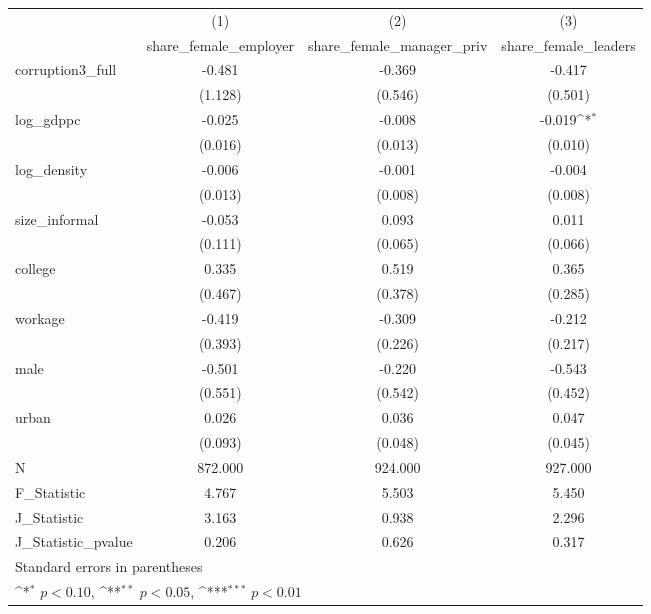 {
\def\sym#1{\ifmmode^{#1}\else\(^{#1}\)\fi}
\begin{tabular}{l*{3}{c}}
\hline\hline
            &\multicolumn{1}{c}{(1)}&\multicolumn{1}{c}{(2)}&\multicolumn{1}{c}{(3)}\\
            &\multicolumn{1}{c}{share\_female\_employer}&\multicolumn{1}{c}{share\_female\_manager\_priv}&\multicolumn{1}{c}{share\_female\_leaders}\\
\hline
corruption3\_full&      -0.481         &      -0.369         &      -0.417         \\
            &     (1.128)         &     (0.546)         &     (0.501)         \\
[1em]
log\_gdppc   &      -0.025         &      -0.008         &      -0.019\sym{*}  \\
            &     (0.016)         &     (0.013)         &     (0.010)         \\
[1em]
log\_density &      -0.006         &      -0.001         &      -0.004         \\
            &     (0.013)         &     (0.008)         &     (0.008)         \\
[1em]
size\_informal&      -0.053         &       0.093         &       0.011         \\
            &     (0.111)         &     (0.065)         &     (0.066)         \\
[1em]
college     &       0.335         &       0.519         &       0.365         \\
            &     (0.467)         &     (0.378)         &     (0.285)         \\
[1em]
workage     &      -0.419         &      -0.309         &      -0.212         \\
            &     (0.393)         &     (0.226)         &     (0.217)         \\
[1em]
male        &      -0.501         &      -0.220         &      -0.543         \\
            &     (0.551)         &     (0.542)         &     (0.452)         \\
[1em]
urban       &       0.026         &       0.036         &       0.047         \\
            &     (0.093)         &     (0.048)         &     (0.045)         \\
\hline
N           &     872.000         &     924.000         &     927.000         \\
F\_Statistic &       4.767         &       5.503         &       5.450         \\
J\_Statistic &       3.163         &       0.938         &       2.296         \\
J\_Statistic\_pvalue&       0.206         &       0.626         &       0.317         \\
\hline\hline
\multicolumn{4}{l}{\footnotesize Standard errors in parentheses}\\
\multicolumn{4}{l}{\footnotesize \sym{*} \(p<0.10\), \sym{**} \(p<0.05\), \sym{***} \(p<0.01\)}\\
\end{tabular}
}
